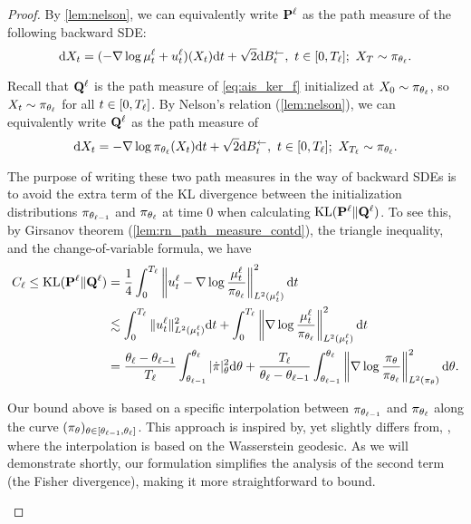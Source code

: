 \begin{proof}
    By \cref{lem:nelson}, we can equivalently write $\mathbf{P}^\ell$ as the path measure of the following backward SDE:
    $$\mathrm{d} X_t=(-\nabla\log\mu^\ell_t+u^\ell_t)(X_t)\mathrm{d} t+\sqrt{2}\mathrm{d}B^\gets_t,~t\in[0,T_\ell];~X_T\sim\pi_{\theta_{\ell}}.$$

    Recall that $\mathbf{Q}^\ell$ is the path measure of \cref{eq:ais_ker_f} initialized at $X_0\sim\pi_{\theta_\ell}$, so $X_t\sim\pi_{\theta_\ell}$ for all $t\in[0,T_\ell]$. By Nelson's relation (\cref{lem:nelson}), we can equivalently write $\mathbf{Q}^\ell$ as the path measure of
    $$\mathrm{d} X_t=-\nabla\log\pi_{\theta_\ell}(X_t)\mathrm{d} t+\sqrt{2}\mathrm{d}B^\gets_t,~t\in[0,T_\ell];~X_{T_\ell}\sim\pi_{\theta_\ell}.$$

    The purpose of writing these two path measures in the way of backward SDEs is to avoid the extra term of the KL divergence between the initialization distributions $\pi_{\theta_{\ell-1}}$ and $\pi_{\theta_\ell}$ at time $0$ when calculating $\operatorname{KL}(\mathbf{P}^\ell\|\mathbf{Q}^\ell)$. To see this, by Girsanov theorem (\cref{lem:rn_path_measure_contd}), the triangle inequality, and the change-of-variable formula, we have
    \begin{align*}
        C_\ell\le\operatorname{KL}(\mathbf{P}^\ell\|\mathbf{Q}^\ell) & =\frac{1}{4}\int_{0}^{T_\ell}\left\|u^\ell_t-\nabla\log\frac{\mu_t^\ell}{\pi_{\theta_\ell}}\right\|^2_{L^2(\mu^\ell_t)}\mathrm{d} t                                                                                                                                                 \\
                                     & \lesssim\int_{0}^{T_\ell}\|u^\ell_t\|^2_{L^2(\mu^\ell_t)}\mathrm{d} t+\int_{0}^{T_\ell}\left\|\nabla\log\frac{\mu_t^\ell}{\pi_{\theta_\ell}}\right\|^2_{L^2(\mu^\ell_t)}\mathrm{d} t                                                                                                        \\
                                     & =\frac{\theta_\ell-\theta_{\ell-1}}{T_\ell}\int_{\theta_{\ell-1}}^{\theta_\ell}|\dot\pi|_\theta^2\mathrm{d}\theta+\frac{T_\ell}{\theta_\ell-\theta_{\ell-1}}\int_{\theta_{\ell-1}}^{\theta_\ell}\left\|\nabla\log\frac{\pi_\theta}{\pi_{\theta_\ell}}\right\|_{L^2(\pi_\theta)}^2\mathrm{d}\theta.
    \end{align*}
    \begin{remark}
        Our bound above is based on a specific interpolation between $\pi_{\theta_{\ell-1}}$ and $\pi_{\theta_\ell}$ along the curve $(\pi_\theta)_{\theta\in[\theta_{\ell-1},\theta_\ell]}$. This approach is inspired by, yet slightly differs from, \citet[Theorem 1.6]{conforti2021a}, where the interpolation is based on the Wasserstein geodesic. As we will demonstrate shortly, our formulation simplifies the analysis of the second term (the Fisher divergence), making it more straightforward to bound.
    \end{remark}
    

\end{proof}

